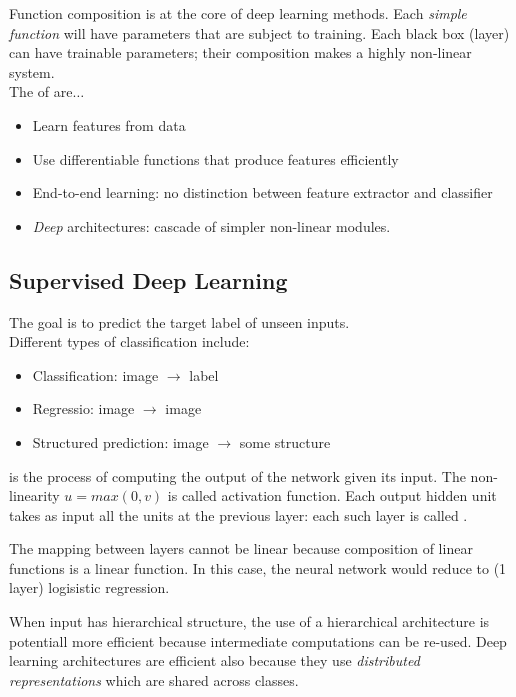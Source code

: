 \documentclass{article}
\begin{document}
Function composition is at the core of deep learning methods. Each \emph{simple function} will have parameters that are subject to training. Each black box (layer) can have trainable parameters; their composition makes a highly non-linear system. \\ 

The  of  are$\dots$ 
\begin{itemize}
  \item Learn features from data 
  \item Use differentiable functions that produce features efficiently 
  \item End-to-end learning: no distinction between feature extractor and classifier 
  \item \emph{Deep} architectures: cascade of simpler non-linear modules. 
\end{itemize}

\subsection{Supervised Deep Learning}

The goal is to predict the target label of unseen inputs. \\ 

Different types of classification include: 
\begin{itemize}
  \item Classification: image $\rightarrow$ label 
  \item Regressio: image $\rightarrow$ image 
  \item Structured prediction: image $\rightarrow$ some structure
\end{itemize}

 is the process of computing the output of the network given its input. The non-linearity $u=max(0,v)$ is called  activation function. Each output hidden unit takes as input all the units at the previous layer: each such layer is called . 

\begin{remark}
  The mapping between layers cannot be linear because composition of linear functions is a linear function. In this case, the neural network would reduce to (1 layer) logisistic regression. 
\end{remark}

When input has hierarchical structure, the use of a hierarchical architecture is potentiall more efficient because intermediate computations can be re-used. Deep learning architectures are efficient also because they use \emph{distributed representations} which are shared across classes. \\ 
\end{document}
